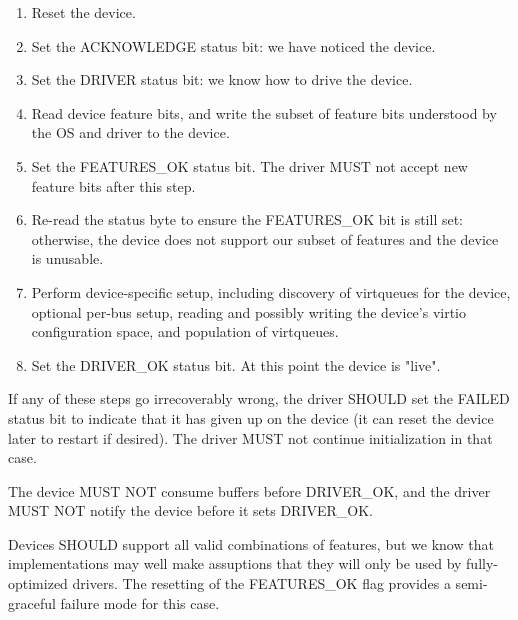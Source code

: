 \begin{enumerate}
\item Reset the device.

\item Set the ACKNOWLEDGE status bit: we have noticed the device.

\item Set the DRIVER status bit: we know how to drive the device.

\item Read device feature bits, and write the subset of feature bits
   understood by the OS and driver to the device.

\item\label{item:General Initialization And Device Operation / Device Initialization / Set FEATURES-OK} Set the FEATURES_OK status bit.  The driver MUST not accept
   new feature bits after this step.

\item\label{item:General Initialization And Device Operation / Device Initialization / Re-read FEATURES-OK} Re-read the status byte to ensure the FEATURES_OK bit is still
   set: otherwise, the device does not support our subset of features
   and the device is unusable.

\item\label{item:General Initialization And Device Operation / Device Initialization / Device-specific Setup} Perform device-specific setup, including discovery of virtqueues for the
   device, optional per-bus setup, reading and possibly writing the
   device's virtio configuration space, and population of virtqueues.

\item\label{item:General Initialization And Device Operation / Device Initialization / Set DRIVER-OK} Set the DRIVER_OK status bit.  At this point the device is
   "live".
\end{enumerate}

If any of these steps go irrecoverably wrong, the driver SHOULD
set the FAILED status bit to indicate that it has given up on the
device (it can reset the device later to restart if desired).  The
driver MUST not continue initialization in that case.

The device MUST NOT consume buffers before DRIVER_OK, and the driver
MUST NOT notify the device before it sets DRIVER_OK.

Devices SHOULD support all valid combinations of features, but we know
that implementations may well make assuptions that they will only be
used by fully-optimized drivers.  The resetting of the FEATURES_OK flag
provides a semi-graceful failure mode for this case.


